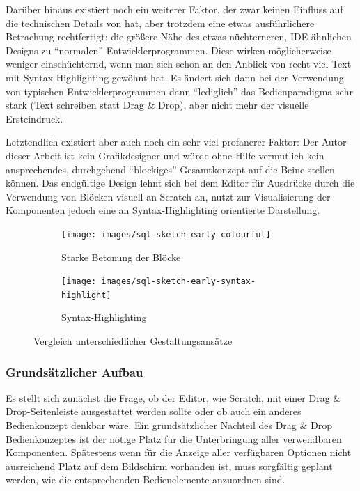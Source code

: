 Darüber hinaus existiert noch ein weiterer Faktor, der zwar keinen Einfluss auf die technischen Details von \idename{} hat, aber trotzdem eine etwas ausführlichere Betrachung rechtfertigt: die größere Nähe des etwas nüchterneren, IDE-ähnlichen Designs zu "`normalen"' Entwicklerprogrammen. Diese wirken möglicherweise weniger einschüchternd, wenn man sich schon an den Anblick von recht viel Text mit Syntax-Highlighting gewöhnt hat. Es ändert sich dann bei der Verwendung von typischen Entwicklerprogrammen dann "`lediglich"' das Bedienparadigma sehr stark (Text schreiben statt Drag \& Drop), aber nicht mehr der visuelle Ersteindruck.

Letztendlich existiert aber auch noch ein sehr viel profanerer Faktor: Der Autor dieser Arbeit ist kein Grafikdesigner und würde ohne Hilfe vermutlich kein ansprechendes, durchgehend "`blockiges"' Gesamtkonzept auf die Beine stellen können. Das endgültige Design lehnt sich bei dem Editor für Ausdrücke durch die Verwendung von Blöcken visuell an Scratch an, nutzt zur Visualisierung der Komponenten jedoch eine an Syntax-Highlighting orientierte Darstellung.

\begin{figure}[h]
  \begin{subfigure}[b]{0.45\textwidth}
    \texttt{[image: images/sql-sketch-early-colourful]}
    \caption{Starke Betonung der Blöcke}
    \label{fig:screen-sql-editor-early-colourful}
  \end{subfigure}\hfill
  \begin{subfigure}[b]{0.45\textwidth}
    \texttt{[image: images/sql-sketch-early-syntax-highlight]}
    \caption{Syntax-Highlighting}
    \label{fig:screen-sql-editor-early-syntax-highlighting}
  \end{subfigure}
  \caption{Vergleich unterschiedlicher Gestaltungsansätze}
  \label{fig:compare-colourful}
\end{figure}

\subsubsection{Grundsätzlicher Aufbau}

Es stellt sich zunächst die Frage, ob der Editor, wie Scratch, mit einer Drag \& Drop-Seitenleiste ausgestattet werden sollte oder ob auch ein anderes Bedienkonzept denkbar wäre. Ein grundsätzlicher Nachteil des Drag \& Drop Bedienkonzeptes ist der nötige Platz für die Unterbringung aller verwendbaren Komponenten. Spätestens wenn für die Anzeige aller verfügbaren Optionen nicht ausreichend Platz auf dem Bildschirm vorhanden ist, muss sorgfältig geplant werden, wie die entsprechenden Bedienelemente anzuordnen sind.


